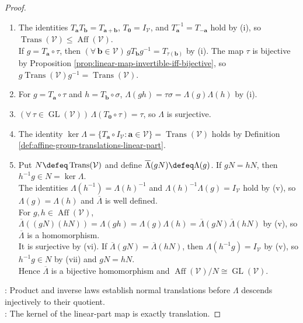 \begin{theorem}
\begin{proof}
\begin{enumerate}[label=(\roman*)]
For $g=T_{\mathbf{a}}\circ\tau$, put $h\defeq T_{-\tau^{-1}(\mathbf{a})}\circ\tau^{-1}\in\operatorname{Aff}(\mathcal{V})$. The identity $gh=hg=T_{\mathbf{0}}\circ I_{\mathcal{V}}$ holds by (i), so $h=g^{-1}$ and $\operatorname{Aff}(\mathcal{V})$ is a group.
\item The identities $T_{\mathbf{a}}T_{\mathbf{b}}=T_{\mathbf{a}+\mathbf{b}}$, $T_{\mathbf{0}}=I_{\mathcal{V}}$, and $T_{\mathbf{a}}^{-1}=T_{-\mathbf{a}}$ hold by (i), so $\operatorname{Trans}(\mathcal{V})\leq\operatorname{Aff}(\mathcal{V})$.\\
If $g=T_{\mathbf{a}}\circ\tau$, then $(\forall\,\mathbf{b}\in\mathcal{V})\,gT_{\mathbf{b}}g^{-1}=T_{\tau(\mathbf{b})}$ by (i). The map $\tau$ is bijective by Proposition \ref{prop:linear-map-invertible-iff-bijective}, so $g\operatorname{Trans}(\mathcal{V})g^{-1}=\operatorname{Trans}(\mathcal{V})$.
\item For $g=T_{\mathbf{a}}\circ\tau$ and $h=T_{\mathbf{b}}\circ\sigma$, $\Lambda(gh)=\tau\sigma=\Lambda(g)\Lambda(h)$ by (i).
\item $(\forall\,\tau\in\operatorname{GL}(\mathcal{V}))\,\Lambda(T_{\mathbf{0}}\circ\tau)=\tau$, so $\Lambda$ is surjective.
\item The identity $\ker\Lambda=\{T_{\mathbf{a}}\circ I_{\mathcal{V}}:\mathbf{a}\in\mathcal{V}\}=\operatorname{Trans}(\mathcal{V})$ holds by Definition \ref{def:affine-group-translations-linear-part}.
\item Put $N\defeq\operatorname{Trans}(\mathcal{V})$ and define $\overline{\Lambda}(gN)\defeq\Lambda(g)$. If $gN=hN$, then $h^{-1}g\in N=\ker\Lambda$.\\
The identities $\Lambda(h^{-1})=\Lambda(h)^{-1}$ and $\Lambda(h)^{-1}\Lambda(g)=I_{\mathcal{V}}$ hold by (v), so $\Lambda(g)=\Lambda(h)$ and $\overline{\Lambda}$ is well defined.\\
For $g,h\in\operatorname{Aff}(\mathcal{V})$, $\overline{\Lambda}((gN)(hN))=\Lambda(gh)=\Lambda(g)\Lambda(h)=\overline{\Lambda}(gN)\overline{\Lambda}(hN)$ by (v), so $\overline{\Lambda}$ is a homomorphism.\\
It is surjective by (vi). If $\overline{\Lambda}(gN)=\overline{\Lambda}(hN)$, then $\Lambda(h^{-1}g)=I_{\mathcal{V}}$ by (v), so $h^{-1}g\in N$ by (vii) and $gN=hN$.\\
Hence $\overline{\Lambda}$ is a bijective homomorphism and $\operatorname{Aff}(\mathcal{V})/N\cong\operatorname{GL}(\mathcal{V})$.
\end{enumerate}
: Product and inverse laws establish normal translations before $\Lambda$ descends injectively to their quotient.\\
: The kernel of the linear-part map is exactly translation.
\end{proof}
\end{theorem}
